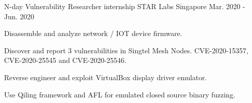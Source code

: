 

\begin{cventries}

  \cventry
    {N-day Vulnerability Researcher internship} %
    {STAR Labs} %
    {Singapore} %
    {Mar. 2020 - Jun. 2020} %
    {
      \begin{cvitems} %
        \item {Disassemble and analyze network / IOT device firmware.}
        \item {Discover and report 3 vulnerabilities in Singtel Mesh Nodes. CVE-2020-15357, CVE-2020-25545 and CVE-2020-25546.}
        \item {Reverse engineer and exploit VirtualBox display driver emulator.}
        \item {Use Qiling framework and AFL for emulated closed source binary fuzzing.}
      \end{cvitems}
    }


\end{cventries}

